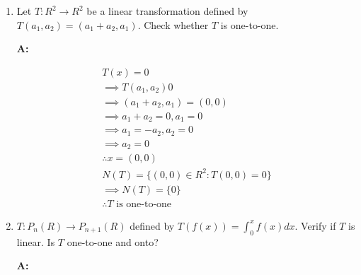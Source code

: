 \documentclass[english,course,fleqn]{lecture}
\newenvironment{qanda}{\begin{enumerate}\setlength{\parindent}{0pt}}{\medskip\end{enumerate}}
\newcommand{\Q}{\bigskip\bfseries \item}
\newcommand{\A}{\par\textbf{A:} \normalfont}
\begin{document}
\begin{qanda}
  \begin{gather*}
    \text{Given: } T:R^{3} \rightarrow R^{2}\\
    T(a_{1}, a_{2}, a_{3}) = (a_{1} - a_{2}, 2 a_{3})\\
    \text{Let: $x \in N(T)$ where $x = (a_{1}, a_{2}, a_{3}) \in R^{3}$}\\
    \implies T(x) = 0\\
    \implies T(a_{1}, a_{2}, a_{3}) = 0\\
    \implies (a_{1} - a_{2}, 2 a_{3}) = (0,0)\\
    \implies a_{1} - a_{2} = 0, 2 a_{3} = 0\\
    \implies a_{1} = a_{2}, a_{3} = 0\\
    \therefore x = (a_{1}, a_{1}, 0)\\
    N(T) = \{(a_{1}, a_{1},0) \in R^{3}: T(a_{1}, a_{1}, 0) = 0 \}\\
    \implies N(T) \ne \{0\}\\
    \implies T \text{ is not one-to-one}
  \end{gather*}

  \Q Let $T:R^{2} \rightarrow R^{2}$ be a linear transformation defined by $T(a_{1}, a_{2}) = (a_{1} + a_{2}, a_{1})$.
  Check whether $T$ is one-to-one.

  \A 

  \begin{gather*}
    T(x) = 0\\
    \implies T(a_{1}, a_{2}) 0\\
    \implies (a_{1} + a_{2}, a_{1}) = (0,0)\\
    \implies a_{1} + a_{2} = 0, a_{1} = 0\\
    \implies a_{1} = -a_{2}, a_{2} = 0\\
    \implies a_{2} = 0\\
    \therefore x = (0,0)\\
    N(T) = \{(0,0) \in R^{2}:T(0,0) = 0\}\\
    \implies N(T) = \{0\}\\
    \therefore \text{$T$ is one-to-one}
  \end{gather*}

  \Q $T:P_{n}(R) \rightarrow P_{n+1}(R)$ defined by $T(f(x)) = \int_{0}^{x}f(x)dx$.
  Verify if $T$ is linear. Is $T$ one-to-one and onto?

  \A


\end{qanda}
\end{document}
